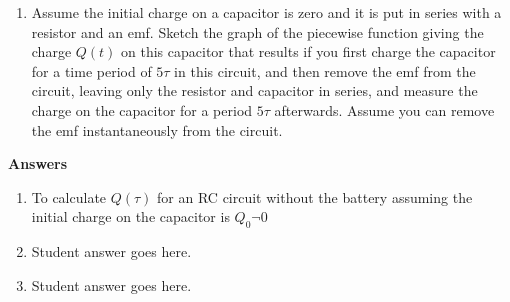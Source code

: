 \documentclass{article}
\begin{document}
\begin{enumerate}
\begin{enumerate}
    \item Assume the initial charge on a capacitor is zero and it is put in series with a resistor and an emf. Sketch the graph of the piecewise function giving the charge $Q(t)$ on this capacitor that results if you first charge the capacitor for a time period of $5\tau$ in this circuit, and then remove the emf from the circuit, leaving only the resistor and capacitor in series, and measure the charge on the capacitor for a period $5\tau$ afterwards. Assume you can remove the emf instantaneously from the circuit. 

  

\end{enumerate}

\color{blue}
\textbf{Answers}
\begin{enumerate}
    \item To calculate $Q(\tau)$ for an RC circuit without the battery assuming the initial charge  on the capacitor is $Q_0\neg 0$
    \item Student answer goes here.
    \item Student answer goes here.
\end{enumerate}
\color{black}

\end{enumerate}





\hrulefill
\end{document}
